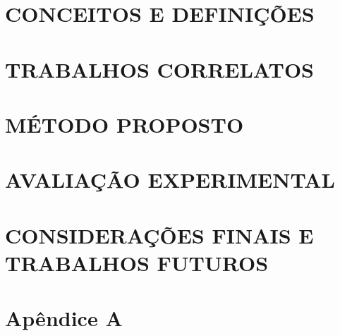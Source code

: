 \documentclass[
	12pt, %
    oneside, %
	a4paper, %
	chapter=TITLE, %
	english, %
	brazil %
	]{abntex2}
\begin{document}
\chapter{CONCEITOS E DEFINIÇÕES}

\chapter{TRABALHOS CORRELATOS}

\chapter{MÉTODO PROPOSTO}

%
\chapter{AVALIAÇÃO EXPERIMENTAL}


\chapter{CONSIDERAÇÕES FINAIS E TRABALHOS FUTUROS}

\chapter{Apêndice A}

\end{document}
